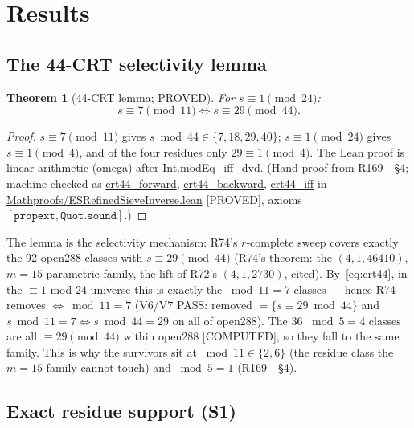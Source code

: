 \documentclass[11pt,a4paper]{article}
\newtheorem{theorem}{Theorem}
\theoremstyle{definition}
\begin{document}
\section{Results}

\subsection{The 44-CRT selectivity lemma}

\begin{theorem}[44-CRT lemma; PROVED]
  \label{thm:crt44}
  For $s\equiv1\pmod{24}$:
  \begin{equation}
    \label{eq:crt44}
    s\equiv7\pmod{11}\iff s\equiv29\pmod{44}.
  \end{equation}
\end{theorem}
\begin{proof}
$s\equiv7\pmod{11}$ gives $s\bmod44\in\{7,18,29,40\}$;
$s\equiv1\pmod{24}$ gives $s\equiv1\pmod4$, and of the four residues
only $29\equiv1\pmod4$. The Lean proof is linear arithmetic
(\url{omega}) after \url{Int.modEq_iff_dvd}. (Hand proof from
R169~\cite{R169}~\S4; machine-checked as
\url{crt44_forward}, \url{crt44_backward}, \url{crt44_iff}
in \url{Mathproofs/ESRefinedSieveInverse.lean} [PROVED], axioms
$[\texttt{propext},\texttt{Quot.sound}]$.)
\end{proof}

The lemma is the selectivity mechanism: R74's $r$-complete sweep covers
exactly the 92 open288 classes with $s\equiv29\pmod{44}$ (R74's theorem:
the $(4,1,46410)$, $m=15$ parametric family, the lift of R72's
$(4,1,2730)$, cited). By~\eqref{eq:crt44}, in the $\equiv1$-mod-$24$
universe this is exactly the $\bmod11=7$ classes --- hence R74 removes
$\iff\bmod11=7$ (V6/V7 PASS: removed $=\{s\equiv29\bmod44\}$ and
$s\bmod11=7\iff s\bmod44=29$ on all of open288). The 36
$\bmod5=4$ classes are all $\equiv29\pmod{44}$ within open288
[COMPUTED], so they fall to the same family. This is why the survivors
sit at $\bmod11\in\{2,6\}$ (the residue class the $m=15$ family cannot
touch) and $\bmod5=1$ (R169~\cite{R169}~\S4).

\subsection{Exact residue support (S1)}
\end{document}
